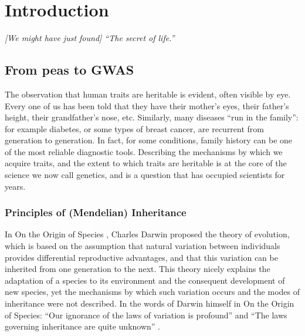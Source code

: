 
\chapter{Introduction}  %

\textit{[We might have just found] “The secret of life.”}\\

\section{From peas to GWAS}  %

The observation that human traits are heritable is evident, often visible by eye. 
Every one of us has been told that they have their mother’s eyes, their father’s height, their grandfather’s nose, etc. 
Similarly, many diseases “run in the family”: for example diabetes, or some types of breast cancer, are recurrent from generation to generation. 
In fact, for some conditions, family history can be one of the most reliable diagnostic tools. 
Describing the mechanisms by which we acquire traits, and the extent to which traits are heritable is at the core of the science we now call genetics, and is a question that has occupied scientists for years.

\subsection{Principles of (Mendelian) Inheritance} %

In On the Origin of Species \cite{darwin1859origin}, Charles Darwin proposed the theory of evolution, which is based on the assumption that natural variation between individuals provides differential reproductive advantages, and that this variation can be inherited from one generation to the next. 
This theory nicely explains the adaptation of a species to its environment and the consequent development of new species, yet the mechanisms by which such variation occurs and the modes of inheritance were not described. 
In the words of Darwin himself in On the Origin of Species: “Our ignorance of the laws of variation is profound” and “The laws governing inheritance are quite unknown” \cite{darwin1859origin}.\\

